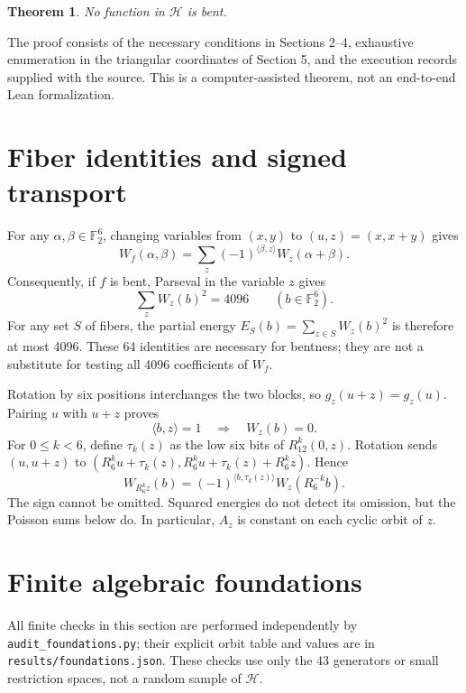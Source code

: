 \documentclass[11pt,a4paper]{article}
\newcommand{\F}{\mathbb F_2}
\newtheorem{theorem}{Theorem}
\begin{document}
\begin{theorem}\label{thm:main}
No function in $\mathcal H$ is bent.
\end{theorem}
The proof consists of the necessary conditions in Sections 2--4, exhaustive
enumeration in the triangular coordinates of Section 5, and the execution
records supplied with the source. This is a computer-assisted theorem,
not an end-to-end Lean formalization.

\section{Fiber identities and signed transport}
For any $\alpha,\beta\in\F^6$, changing variables from $(x,y)$ to
$(u,z)=(x,x+y)$ gives
\begin{equation}\label{eq:walsh}
 W_f(\alpha,\beta)=\sum_z(-1)^{\langle\beta,z\rangle}W_z(\alpha+\beta).
\end{equation}
Consequently, if $f$ is bent, Parseval in the variable $z$ gives
\begin{equation}\label{eq:energy}
 \sum_z W_z(b)^2=4096\qquad(b\in\F^6).
\end{equation}
For any set $S$ of fibers, the partial energy
$E_S(b)=\sum_{z\in S}W_z(b)^2$ is therefore at most 4096.
These 64 identities are necessary for bentness; they are not a substitute
for testing all 4096 coefficients of $W_f$.

Rotation by six positions interchanges the two blocks, so
$g_z(u+z)=g_z(u)$. Pairing $u$ with $u+z$ proves
\begin{equation}\label{eq:zero}
 \langle b,z\rangle=1\quad\Longrightarrow\quad W_z(b)=0.
\end{equation}
For $0\le k<6$, define $\tau_k(z)$ as the low six bits of $R_{12}^k(0,z)$.
Rotation sends $(u,u+z)$ to
$(R_6^ku+\tau_k(z),R_6^ku+\tau_k(z)+R_6^kz)$. Hence
\begin{equation}\label{eq:transport}
 W_{R_6^kz}(b)=(-1)^{\langle b,\tau_k(z)\rangle}
                 W_z(R_6^{-k}b).
\end{equation}
The sign cannot be omitted. Squared energies do not detect its omission,
but the Poisson sums below do. In particular, $A_z$ is constant on each
cyclic orbit of $z$.

\section{Finite algebraic foundations}
All finite checks in this section are performed independently by
\texttt{audit\_foundations.py}; their explicit orbit table and values are
in \texttt{results/foundations.json}. These checks use only the 43
generators or small restriction spaces, not a random sample of $\mathcal H$.
\end{document}
